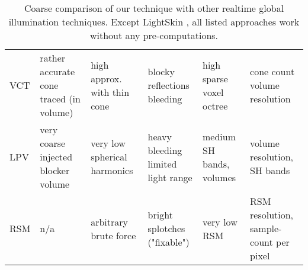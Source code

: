 \documentclass[thesis.tex]{subfiles}
\begin{document}
\begin{landscape}
\begin{table}[h]
\begin{tabular}{llllll}
\specialVspace

\makecell[l]{VCT \\ \cite{bib:voxelconetracing}} & \makecell[l]{rather accurate\\cone traced (in volume)} & \makecell[l]{high\\approx. with thin cone} & \makecell[l]{blocky reflections \\ bleeding} & \makecell[l]{high\\sparse voxel octree} & \makecell[l]{cone count\\ volume resolution} \\

\specialVspace

\makecell[l]{LPV \\ \cite{bib:lpt}} & \makecell[l]{very coarse\\injected blocker volume} & \makecell[l]{very low\\spherical harmonics} & \makecell[l]{heavy bleeding\\limited light range} & \makecell[l]{medium\\SH bands, volumes}  & \makecell[l]{volume resolution,\\SH bands} \\

\specialVspace

\makecell[l]{RSM \\ \cite{bib:reflectiveshadowmaps}} & n/a & \makecell[l]{arbitrary\\brute force} & \makecell[l]{bright splotches \\ ("fixable")} & \makecell[l]{very low\\RSM} & \makecell[l]{RSM resolution,\\sample-count per pixel}\\


\bottomrule
\end{tabular}
\caption{Coarse comparison of our technique with other realtime global illumination techniques. Except LightSkin \cite{bib:LightskinPaper}, all listed approaches work without any pre-computations.}
\label{tab:comparision}
\end{table}

\end{landscape}


\subfilebib %
\end{document}
